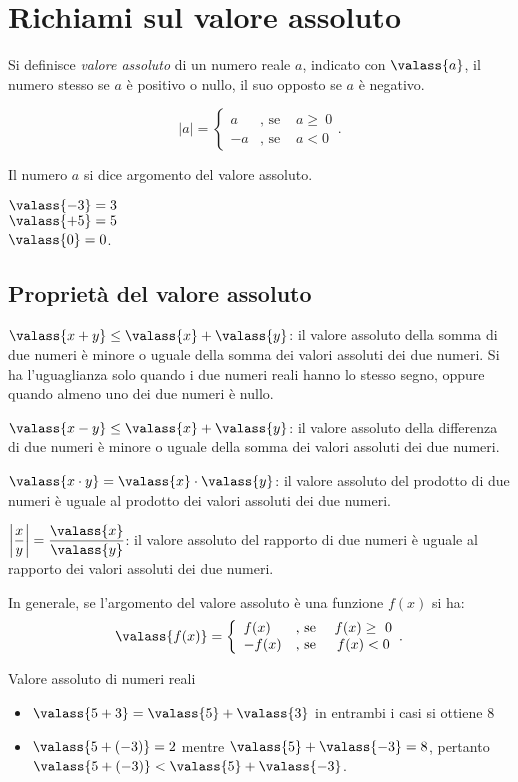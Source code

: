 
\section{Richiami sul valore assoluto}

Si definisce \emph{valore assoluto} di un numero reale $a$, indicato con 
$\valass{a}$, il numero stesso se $a$ è positivo o nullo, il suo opposto se $a$ 
è negativo.

\[
|a|=\left\{\begin{array}{lcc}
 a & \text{, se } & a\ge~0\\
-a & \text{, se } & a<0\end{array}.\right.
\]

Il numero $a$ si dice argomento del valore assoluto.
\begin{multicols}{3}
$\valass{-3}=3$\\$\valass{+5}=5$\\$\valass{0}=0$.
\end{multicols}
\subsection{Proprietà del valore assoluto}
$\valass{x+y}\le \valass{x}+\valass{y}$: il valore assoluto della somma di due 
numeri è minore o uguale della somma dei valori assoluti dei due numeri. Si ha 
l'uguaglianza solo quando i due numeri reali hanno lo stesso segno, oppure 
quando almeno uno dei due numeri è nullo.

$\valass{x-y}\le \valass{x}+\valass{y}$: il valore assoluto della differenza di 
due numeri è minore o uguale della somma dei valori assoluti dei due numeri.

$\valass{x\cdot y}=\valass{x}\cdot \valass{y}$: il valore assoluto del prodotto 
di due numeri
è uguale al prodotto dei valori assoluti dei due numeri.

$\left |{\dfrac{x}{y}}\right|=\dfrac{\valass{x}}{\valass{y}}$: il valore 
assoluto del rapporto di due
numeri è uguale al rapporto dei valori assoluti dei due numeri.

In generale, se l'argomento del valore assoluto è una funzione $f(x)$ si ha:
\[
\valass{f(x)}=\left\{\begin{array}{lcc}
 f(x) & \text{, se } & f(x)\ge~0\\
-f(x) & \text{, se } & f(x)<0\end{array}.\right.
\]
\begin{exrig}
 \begin{esempio}
 Valore assoluto di numeri reali
 \begin{itemize}
 \item $\valass{5+3}=\valass{5}+\valass{3}$ in entrambi i casi si ottiene $8$
 \item $\valass{5+(-3)}=2$ mentre $\valass{5}+\valass{-3}=8$, pertanto 
$\valass{5+(-3)}<\valass{5}+\valass{-3}$.
 \end{itemize}
 \end{esempio}
\end{exrig}

